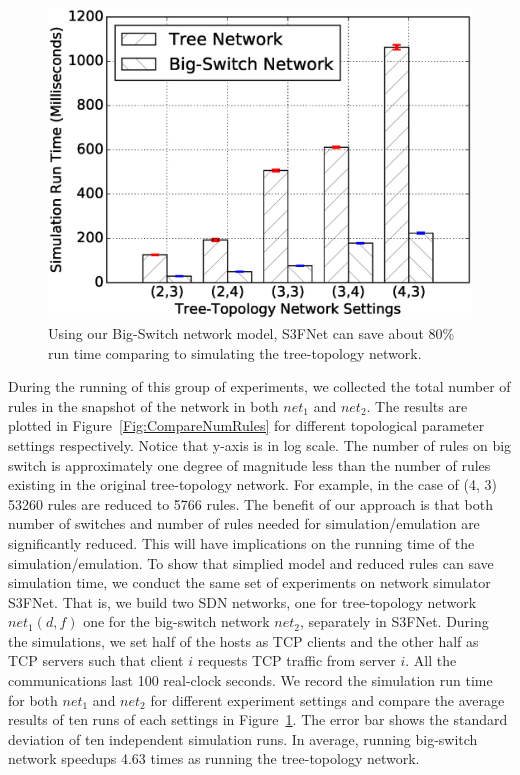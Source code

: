 \begin{figure}[h]
\centering
\includegraphics[scale=.42]{figures/comp_sim_time.eps}
\caption{Using our Big-Switch network model, S3FNet can save about 80\% run time
        comparing to simulating the tree-topology network.}
\label{Fig:CompareSimulationTime}
\end{figure}

During the running of this group of experiments,
we collected the total number of rules in the snapshot of the network in both $net_1$
and $net_2$.
The results are plotted in Figure~\ref{Fig:CompareNumRules} for different
topological parameter settings respectively.
Notice that y-axis is in log scale.
The number of rules on big switch is approximately one degree of magnitude less
than the number of rules existing in the original tree-topology network.
For example, in the case of (4, 3) 53260 rules are reduced to 5766 rules.
The benefit of our approach is that both number of switches and number of rules needed
for simulation/emulation are significantly reduced.
This will have implications on the running time of the simulation/emulation.
To show that simplied model and reduced rules can save simulation time, we conduct
the same set of experiments on network simulator S3FNet\cite{S3F}.
That is, we build two SDN networks, one for tree-topology network $net_1(d, f)$
one for the big-switch network $net_2$, separately in S3FNet.
During the simulations, we set half of the hosts as TCP clients
and the other half as TCP servers such that client $i$ requests TCP traffic from server $i$.
All the communications last 100 real-clock seconds.
We record the simulation run time for both $net_1$ and $net_2$ for different experiment
settings and compare the average results of ten runs of each settings
in Figure~\ref{Fig:CompareSimulationTime}.
The error bar shows the standard deviation of ten independent simulation runs.
In average, running big-switch network speedups 4.63 times as
running the tree-topology network.


